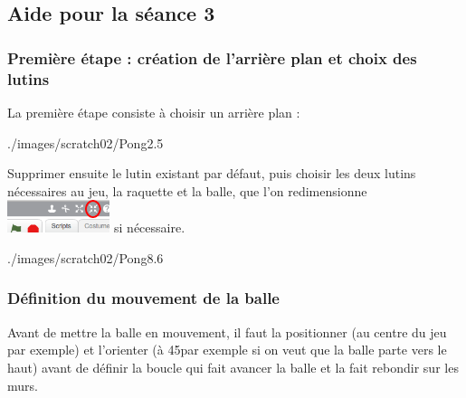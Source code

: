





\subsection{Aide pour la séance 3}\label{aide_seanceScratch3}

\subsubsection{Première étape : création de l'arrière plan et choix des lutins} 

La première étape consiste à choisir un arrière plan :

%
              {./images/scratch02/Pong2}{.5\textwidth}

Supprimer ensuite le lutin existant par défaut, puis choisir les deux lutins nécessaires au jeu, la raquette et la balle, que l'on redimensionne \includegraphics[width=3cm]{./images/scratch02/Pong5} si nécessaire.

%
              {./images/scratch02/Pong8}{.6\textwidth}

\subsubsection{Définition du mouvement de la balle} 

Avant de mettre la balle en mouvement, il faut la positionner (au centre du jeu par exemple) et l'orienter (à 45\degre par exemple si on veut que la balle parte vers le haut) avant de définir la boucle qui fait avancer la balle et la fait rebondir sur les murs.

